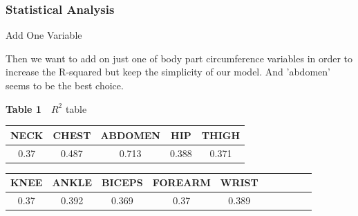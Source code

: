 \documentclass{beamer}
\begin{document}

\begin{frame}
\frametitle{Statistical Analysis}
\begin{block}{Add One Variable}

Then we want to add on just one of body part circumference variables in order to increase the R-squared but keep the simplicity of our model. And 'abdomen' seems to be the best choice.
\end{block}

\begin{center}
\textbf{Table 1}~~$R^2$ table\\

\begin{tabular}{ccccc} \toprule
NECK &	CHEST &	ABDOMEN &	HIP &	THIGH \\ 
\hline
0.37 &	0.487 &	0.713 &	0.388 &	0.371 \\
\bottomrule
\end{tabular}

\begin{tabular}{cccccccccc} \toprule
	KNEE &	ANKLE &	BICEPS &	FOREARM	& WRIST \\ 
\hline
	0.37 &	0.392 &	0.369 &	0.37 &	0.389 \\
\bottomrule
\end{tabular}

\end{center}


\end{frame}
\end{document}
